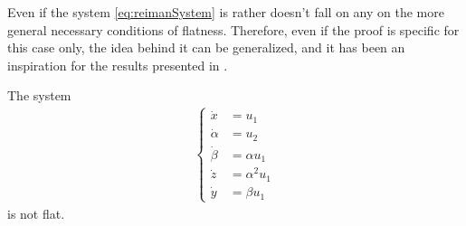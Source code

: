 \documentclass[12pt]{article}
\begin{document}
\begin{remark}
Even if the system \eqref{eq:reimanSystem} is rather doesn't fall on any on the
more general necessary conditions of flatness. Therefore, even if the proof is specific
for this case only, the idea behind it can be generalized, and it has been an inspiration
for the results presented in \citep{AP05}.
\end{remark}

\begin{proposition} \label{reimanSystem}
The system
\begin{align} \label{eq:reimanSystem}
  \begin{cases}
    \dot{x} &= u_1 \\ 
    \dot{\alpha} &= u_2 \\ 
    \dot{\beta} &= \alpha u_1 \\
    \dot{z} &= \alpha^2 u_1 \\
    \dot{y} &= \beta u_1
  \end{cases}
\end{align}
is not flat.
\end{proposition}
\end{document}
